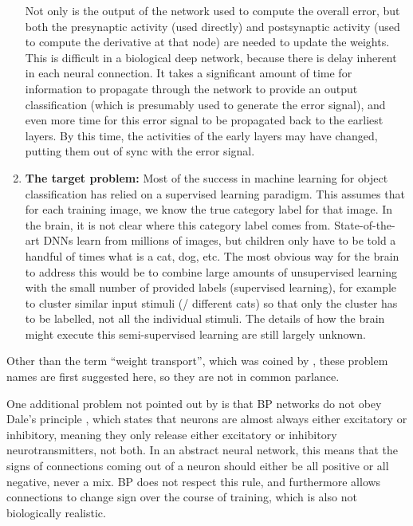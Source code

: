 \begin{enumerate}
    Not only is the output of the network used to compute the overall error,
    but both the presynaptic activity (used directly)
    and postsynaptic activity (used to compute the derivative at that node)
    are needed to update the weights.
    This is difficult in a biological deep network,
    because there is delay inherent in each neural connection.
    It takes a significant amount of time for information to propagate
    through the network to provide an output classification
    (which is presumably used to generate the error signal),
    and even more time for this error signal to be propagated back
    to the earliest layers.
    By this time, the activities of the early layers may have changed,
    putting them out of sync with the error signal.
  \item \textbf{The target problem:}
    Most of the success in machine learning for object classification
    has relied on a supervised learning paradigm.
    This assumes that for each training image,
    we know the true category label for that image.
    In the brain, it is not clear where this category label comes from.
    State-of-the-art DNNs learn from millions of images,
    but children only have to be told a handful of times what is a cat, dog, etc.
    The most obvious way for the brain to address this would be to combine
    large amounts of unsupervised learning
    with the small number of provided labels (supervised learning),
    for example to cluster similar input stimuli (\eg/ different cats)
    so that only the cluster has to be labelled, not all the individual stimuli.
    The details of how the brain might execute this semi-supervised learning
    are still largely unknown.
\end{enumerate}
Other than the term ``weight transport'',
which was coined by \textcite{Grossberg1987},
these problem names are first suggested here,
so they are not in common parlance.

One additional problem not pointed out by \textcite{Bengio2015}
is that BP networks do not obey Dale's principle \parencite{Baldi2016},
which states that neurons are almost always either excitatory or inhibitory,
meaning they only release either excitatory or inhibitory neurotransmitters,
not both.
In an abstract neural network,
this means that the signs of connections coming out of a neuron
should either be all positive or all negative, never a mix.
BP does not respect this rule,
and furthermore allows connections to change sign over the course of training,
which is also not biologically realistic.

